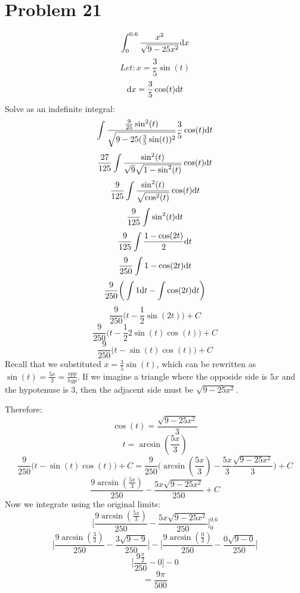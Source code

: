\documentclass[letterpaper, 12pt]{math}
\begin{document}
\section*{Problem 21}
\[ \int_{0}^{0.6}{\frac{x^{2}}{\sqrt{9-25x^{2}}}\mathrm{d}{x}} \]
\[ Let: x = \frac{3}{5}\sin(t) \]
\[ \mathrm{d}{x} = \frac{3}{5}\cos(t)\mathrm{d}{t} \]
Solve as an indefinite integral:
\[ \int{\frac{\frac{9}{25}\sin^{2}(t)}{\sqrt{9-25(\frac{3}{5}\sin(t))^{2}}}
   \frac{3}{5}\cos(t)\mathrm{d}{t}} \]
\[ \frac{27}{125}\int{\frac{\sin^{2}(t)}
   {\sqrt{9}\sqrt{1-\sin^{2}(t)}}\cos(t)\mathrm{d}{t}} \]
\[ \frac{9}{125}\int{\frac{\sin^{2}(t)}{\sqrt{\cos^{2}(t)}}\cos(t)\mathrm{d}{t}} \]
\[ \frac{9}{125}\int{\sin^{2}(t)\mathrm{d}{t}} \]
\[ \frac{9}{125}\int{\frac{1-\cos(2t)}{2}\mathrm{d}{t}} \]
\[ \frac{9}{250}\int{1-\cos(2t)\mathrm{d}{t}} \]
\[ \frac{9}{250}\bigg(\int{1\mathrm{d}{t}}-\int{\cos(2t)\mathrm{d}{t}}\bigg) \]
\[ \frac{9}{250}\bigg(t-\frac{1}{2}\sin(2t)\bigg)+C \]
\[ \frac{9}{250}\bigg(t-\frac{1}{2}2\sin(t)\cos(t)\bigg)+C \]
\[ \frac{9}{250}\bigg(t-\sin(t)\cos(t)\bigg)+C \]
Recall that we substituted \( x = \frac{3}{5}\sin(t) \), which can be rewritten
as \( \sin(t) = \frac{5x}{3} = \frac{opp}{hyp} \). If we imagine a triangle
where the opposide side is \( 5x \) and the hypotenuse is 3, then the adjacent
side must be \( \sqrt{9-25x^{2}} \).
\begin{center}
\end{center}
Therefore:
\[ \cos(t) = \frac{\sqrt{9-25x^{2}}}{3} \]
\[ t = \arcsin(\frac{5x}{3}) \]
\[ \frac{9}{250}\bigg(t-\sin(t)\cos(t)\bigg)+C =
   \frac{9}{250}\bigg(\arcsin(\frac{5x}{3})-
   \frac{5x}{3}\frac{\sqrt{9-25x^{2}}}{3}\bigg)+C \]
\[ \frac{9\arcsin(\frac{5x}{3})}{250}-\frac{5x\sqrt{9-25x^{2}}}{250}+C \]
Now we integrate using the original limits:
\[ \bigg[\frac{9\arcsin(\frac{5x}{3})}{250}-
   \frac{5x\sqrt{9-25x^{2}}}{250}\bigg]_{0}^{0.6} \]
\[ \bigg[\frac{9\arcsin(\frac{3}{3})}{250}-\frac{3\sqrt{9-9}}{250}\bigg]-
   \bigg[\frac{9\arcsin(\frac{0}{3})}{250}-\frac{0\sqrt{9-0}}{250}\bigg] \]
\[ \bigg[\frac{9\frac{\pi}{2}}{250}-0\bigg]-0 \]
\[ = \frac{9\pi}{500} \]
\end{document}
